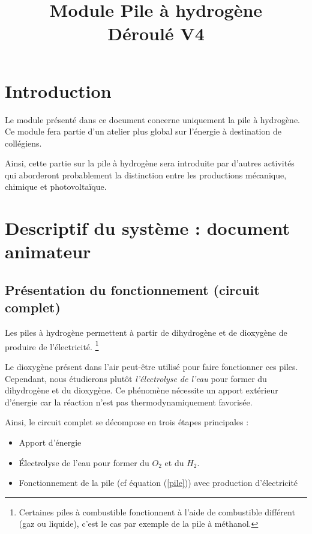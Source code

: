 \documentclass[a4paper, 11pt, twoside]{article}
\title{Module Pile à hydrogène \\ Déroulé V4}
\author{}
\date{}
\numberwithin{equation}{subsection}
\newcommand{\couleur}[1]{\ifbool{Couleur}{\color{#1}}{}}
\newcounter{th}\newcommand{\Thm}[2][]{\couleur{brown}\vspace{3ex}\boxput*(-0.4,1){\setlength{\fboxsep}{0pt}\colorbox{white}{\setlength{\fboxsep}{1ex}\Ovalbox{{\textsc{\ifstrequal{#1}{}{Théorème \stepcounter{th} \theth \phantom{}}{Théorème \stepcounter{th} \theth \phantom{} : #1}}}}}}{\setlength{\fboxsep}{7mm}\doublebox{\noindent \begin{minipage}{0.95\linewidth}\vspace{1ex}#2\end{minipage}}}\vspace{1ex}\couleur{black}}
\begin{document}
	\renewcommand{\contentsname}{Sommaire}
	
	\maketitle
	\pagestyle{fancy}
	
	\section*{Introduction}
	
	Le module présenté dans ce document concerne uniquement la pile à hydrogène. Ce module fera partie d'un atelier plus global sur l'énergie à destination de collégiens.
	
	Ainsi, cette partie sur la pile à hydrogène sera introduite par d'autres activités qui aborderont probablement la distinction entre les productions mécanique, chimique et photovoltaïque.

	\section{Descriptif du système : document animateur}
	
	\subsection{Présentation du fonctionnement (circuit complet)}
		
		Les piles à hydrogène permettent à partir de dihydrogène et de dioxygène de produire de l'électricité. \footnote{Certaines piles à combustible fonctionnent à l'aide de combustible différent (gaz ou liquide), c'est le cas par exemple de la pile à méthanol.}
	
	Le dioxygène présent dans l'air peut-être utilisé pour faire fonctionner ces piles. Cependant, nous étudierons plutôt \emph{l'électrolyse de l'eau} pour former du dihydrogène et du dioxygène. Ce phénomène nécessite un apport extérieur d'énergie car la réaction n'est pas thermodynamiquement favorisée.
	
	Ainsi, le circuit complet se décompose en trois étapes principales :
	\begin{itemize}
		\item Apport d'énergie
		\item Électrolyse de l'eau pour former du $O_2$ et du $H_2$.
		\item Fonctionnement de la pile (cf équation (\ref{pile})) avec production d'électricité
	\end{itemize}
	
\end{document}

